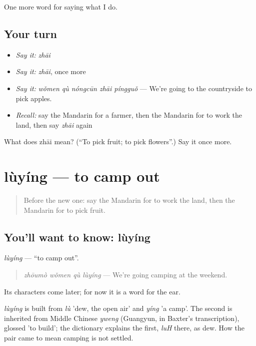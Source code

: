\begin{grammarlens}[title={What you've built}]
One more word for saying what I do.
\end{grammarlens}

\subsection*{Your turn}
\begin{itemize}
\raggedright
  \item \emph{Say it:} \emph{zhāi}
  \item \emph{Say it:} \emph{zhāi}, once more
  \item \emph{Say it:} \emph{wǒmen qù nóngcūn zhāi píngguǒ} — We're going to the countryside to pick apples.
  \item \emph{Recall:} say the Mandarin for a farmer, then the Mandarin for to work the land, then say \emph{zhāi} again
\end{itemize}

\begin{tcolorbox}[breakable,colback=teal!4,colframe=teal!35!black,title={Before you move on}]
What does zhāi mean? (\textquotedblleft{}To pick fruit; to pick flowers\textquotedblright{}.) Say it once more.
\end{tcolorbox}
\section[lùyíng]{lùyíng — to camp out}

\label{lesson:ZH-C225-luying}



\begin{quote}
Before the new one: say the Mandarin for to work the land, then the Mandarin for to pick fruit.
\end{quote}

\subsection*{You'll want to know: lùyíng}
\emph{lùyíng} — \textquotedblleft{}to camp out\textquotedblright{}.

\begin{quote}
\emph{zhōumò wǒmen qù lùyíng} — We're going camping at the weekend.
\end{quote}

Its characters come later; for now it is a word for the ear.

\begin{cousinweb}
\emph{lùyíng} is built from \emph{lù} 'dew, the open air' and \emph{yíng} 'a camp'. The second is inherited from Middle Chinese \emph{yweng} (Guangyun, in Baxter's transcription), glossed 'to build'; the dictionary explains the first, \emph{luH} there, as dew. How the pair came to mean camping is not settled.
\end{cousinweb}

